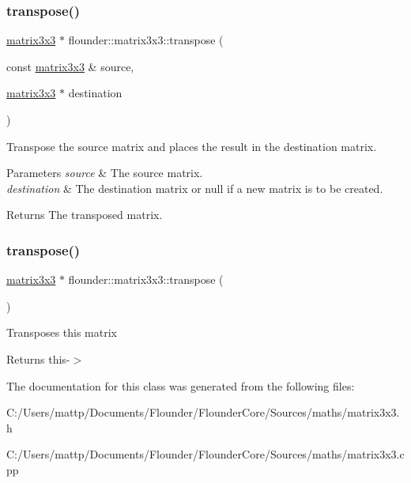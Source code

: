 \subsubsection{\texorpdfstring{transpose()}{transpose()}\hspace{0.1cm}{\footnotesize\ttfamily [1/2]}}
{\footnotesize\ttfamily \hyperlink{classflounder_1_1matrix3x3}{matrix3x3} $\ast$ flounder\+::matrix3x3\+::transpose (\begin{DoxyParamCaption}\item[{const \hyperlink{classflounder_1_1matrix3x3}{matrix3x3} \&}]{source,  }\item[{\hyperlink{classflounder_1_1matrix3x3}{matrix3x3} $\ast$}]{destination }\end{DoxyParamCaption})\hspace{0.3cm}{\ttfamily [static]}}



Transpose the source matrix and places the result in the destination matrix. 


\begin{DoxyParams}{Parameters}
{\em source} & The source matrix. \\
\hline
{\em destination} & The destination matrix or null if a new matrix is to be created. \\
\hline
\end{DoxyParams}
\begin{DoxyReturn}{Returns}
The transposed matrix. 
\end{DoxyReturn}
\mbox{\label{classflounder_1_1matrix3x3_a2cfe1b42645dda116f8251ef183c4028}} 
\subsubsection{\texorpdfstring{transpose()}{transpose()}\hspace{0.1cm}{\footnotesize\ttfamily [2/2]}}
{\footnotesize\ttfamily \hyperlink{classflounder_1_1matrix3x3}{matrix3x3} $\ast$ flounder\+::matrix3x3\+::transpose (\begin{DoxyParamCaption}{ }\end{DoxyParamCaption})}



Transposes this matrix 

\begin{DoxyReturn}{Returns}
this-\/$>$ 
\end{DoxyReturn}


The documentation for this class was generated from the following files\+:\begin{DoxyCompactItemize}
\item 
C\+:/\+Users/mattp/\+Documents/\+Flounder/\+Flounder\+Core/\+Sources/maths/matrix3x3.\+h\item 
C\+:/\+Users/mattp/\+Documents/\+Flounder/\+Flounder\+Core/\+Sources/maths/matrix3x3.\+cpp\end{DoxyCompactItemize}
